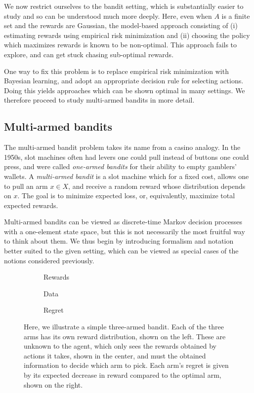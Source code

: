 \documentclass[11pt]{book}
\begin{document}
We now restrict ourselves to the bandit setting, which is substantially easier to study and so can be understood much more deeply.
Here, even when $A$ is a finite set and the rewards are Gaussian, the model-based approach consisting of (i) estimating rewards using empirical risk minimization and (ii) choosing the policy which maximizes rewards is known to be non-optimal.
This approach fails to explore, and can get stuck chasing sub-optimal rewards.

One way to fix this problem is to replace empirical risk minimization with Bayesian learning, and adopt an appropriate decision rule for selecting actions.
Doing this yields approaches which can be shown optimal in many settings.
We therefore proceed to study multi-armed bandits in more detail.

\subsection{Multi-armed bandits}

The multi-armed bandit problem takes its name from a casino analogy.
In the 1950s, slot machines often had levers one could pull instead of buttons one could press, and were called \emph{one-armed bandits} for their ability to empty gamblers' wallets.
A \emph{multi-armed bandit} is a slot machine which for a fixed cost, allows one to pull an arm $x \in X$, and receive a random reward whose distribution depends on $x$.
The goal is to minimize  expected loss, or, equivalently, maximize total expected rewards.

Multi-armed bandits can be viewed as discrete-time Markov decision processes with a one-element state space, but this is not necessarily the most fruitful way to think about them.
We thus begin by introducing formalism and notation better suited to the given setting, which can be viewed as special cases of the notions considered previously.

\begin{figure}
\begin{subfigure}{0.3\textwidth}

\caption{Rewards}
\end{subfigure}
\begin{subfigure}{0.3\textwidth}

\caption{Data}
\end{subfigure}
\begin{subfigure}{0.3\textwidth}

\caption{Regret}
\end{subfigure}
\caption{Here, we illustrate a simple three-armed bandit. 
Each of the three arms has its own reward distribution, shown on the left.
These are unknown to the agent, which only sees the rewards obtained by actions it takes, shown in the center, and must the obtained information to decide which arm to pick.
Each arm's regret is given by its expected decrease in reward compared to the optimal arm, shown on the right.}
\end{figure}
\end{document}

